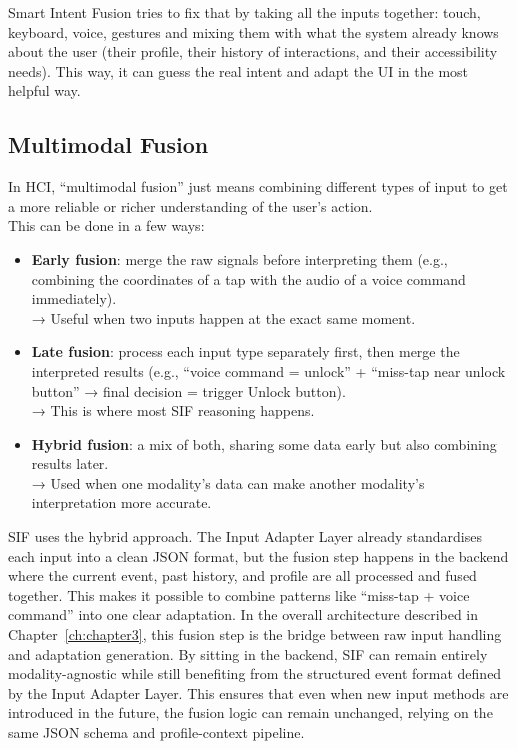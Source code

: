 \documentclass[openany]{book}
\begin{document}
Smart Intent Fusion tries to fix that by taking all the inputs together: touch, keyboard, voice, gestures and mixing them with what the system already knows about the user (their profile, their history of interactions, and their accessibility needs). This way, it can guess the real intent and adapt the UI in the most helpful way.

\subsection{Multimodal Fusion}
In HCI, “multimodal fusion” just means combining different types of input to get a more reliable or richer understanding of the user’s action. 
\\This can be done in a few ways:
\begin{itemize}
    \item \textbf{Early fusion}: merge the raw signals before interpreting them (e.g., combining the coordinates of a tap with the audio of a voice command immediately). \\
    → Useful when two inputs happen at the exact same moment.
    \item \textbf{Late fusion}: process each input type separately first, then merge the interpreted results (e.g., “voice command = unlock” + “miss-tap near unlock button” → final decision = trigger Unlock button).\\
    → This is where most SIF reasoning happens.
    \item \textbf{Hybrid fusion}: a mix of both, sharing some data early but also combining results later. \\
    → Used when one modality’s data can make another modality’s interpretation more accurate.
\end{itemize}
SIF uses the hybrid approach. The Input Adapter Layer already standardises each input into a clean JSON format, but the fusion step happens in the backend where the current event, past history, and profile are all processed and fused together. This makes it possible to combine patterns like “miss-tap + voice command” into one clear adaptation. In the overall architecture described in Chapter~\ref{ch:chapter3}, this fusion step is the bridge between raw input handling and adaptation generation. By sitting in the backend, SIF can remain entirely modality-agnostic while still benefiting from the structured event format defined by the Input Adapter Layer. This ensures that even when new input methods are introduced in the future, the fusion logic can remain unchanged, relying on the same JSON schema and profile-context pipeline.
\end{document}

